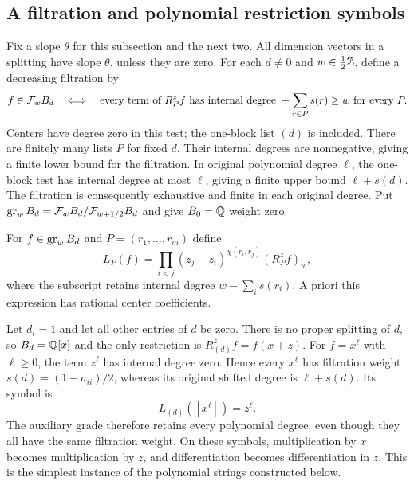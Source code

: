 \subsection{A filtration and polynomial restriction symbols}

Fix a slope $\theta$ for this subsection and the next two.  All
dimension vectors in a splitting have slope $\theta$, unless they are
zero.  For each $d\ne0$ and $w\in\tfrac12\mathbb Z$, define a decreasing
filtration by
\begin{equation}\label{alg:filtration}
 f\in\mathcal F_wB_d
 \quad\Longleftrightarrow\quad
 \text{every term of }R_P^zf\text{ has internal degree }
       +\sum_{r\in P}s(r)\ge w\text{ for every }P.
\end{equation}
Centers have degree zero in this test; the one-block list $(d)$ is
included.  There are finitely many lists $P$ for fixed $d$.  Their
internal degrees are nonnegative, giving a finite lower bound for the
filtration.  In original polynomial degree $\ell$, the one-block test
has internal degree at most $\ell$, giving a finite upper bound
$\ell+s(d)$.  The filtration is consequently exhaustive and finite
in each original degree.  Put
$\operatorname{gr}_wB_d=\mathcal F_wB_d/\mathcal F_{w+1/2}B_d$ and give $B_0=\mathbb Q$ weight zero.

For $f\in\operatorname{gr}_wB_d$ and $P=(r_1,\ldots,r_m)$ define
\begin{equation}\label{alg:symbol}
 L_P(f)=
 \prod_{i<j}(z_j-z_i)^{\chi(r_i,r_j)}
          (R_P^zf)_w,
\end{equation}
where the subscript retains internal degree
$w-\sum_i s(r_i)$.  A priori this expression has rational center
coefficients.

\begin{example}
\label{alg:one-variable}
Let $d_i=1$ and let all other entries of $d$ be zero.  There is no
proper splitting of $d$, so $B_d=\mathbb Q[x]$ and the only restriction is
$R_{(d)}^z f=f(x+z)$.  For $f=x^\ell$ with $\ell\ge0$, the term $z^\ell$ has
internal degree zero.  Hence every $x^\ell$ has filtration weight
$s(d)=(1-a_{ii})/2$, whereas its original shifted degree is
$\ell+s(d)$.  Its symbol is
\[
 L_{(d)}([x^\ell])=z^\ell.
\]
The auxiliary grade therefore retains every polynomial degree, even
though they all have the same filtration weight.  On these symbols,
multiplication by $x$ becomes multiplication by $z$, and differentiation
becomes differentiation in $z$.  This is the simplest instance of
the polynomial strings constructed below.
\end{example}


